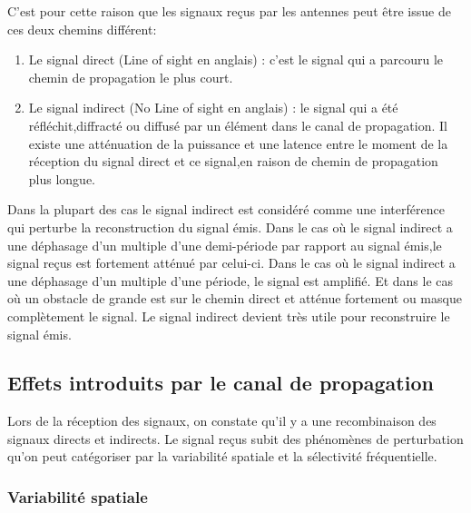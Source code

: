 C'est pour cette raison que les signaux reçus par les antennes peut être issue de ces deux chemins différent:\\
\begin{enumerate}
\item Le signal direct (Line of sight en anglais) : c'est le signal qui a parcouru le chemin de propagation le plus court. 
\item Le signal indirect (No Line of sight en anglais) : le signal qui a été réfléchit,diffracté ou diffusé par un élément dans le canal de propagation. Il existe une atténuation de la puissance et une latence entre le moment de la réception du signal direct et ce signal,en raison de chemin de propagation plus longue.\\
\end {enumerate} 

Dans la plupart des cas le signal indirect est considéré comme une interférence qui perturbe la reconstruction du signal émis. Dans le cas où le signal indirect a une déphasage d'un multiple d'une demi-période par rapport au signal émis,le signal reçus est fortement atténué par celui-ci. Dans le cas où le signal indirect a une déphasage d'un multiple d'une période, le signal est amplifié. Et dans le cas où un obstacle de grande est sur le chemin direct et atténue fortement ou masque complètement le signal. Le signal indirect devient très utile pour reconstruire le signal émis.


\subsection{Effets introduits par le canal de propagation}
\label{Effets}

Lors de la réception des signaux, on constate qu'il y a une recombinaison des signaux directs et indirects. Le signal reçus subit des phénomènes de perturbation qu'on peut catégoriser par la variabilité spatiale et la sélectivité fréquentielle.

\subsubsection{Variabilité spatiale}

